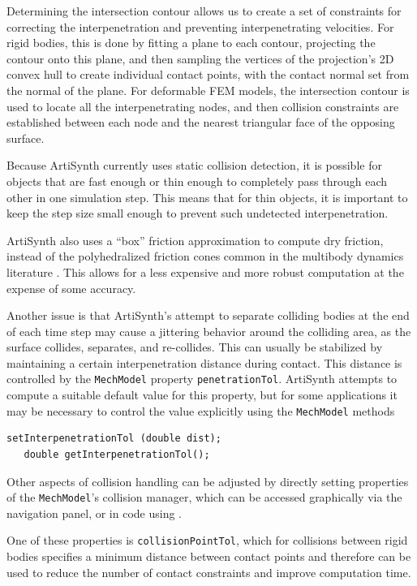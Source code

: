 Determining the intersection contour allows us to create a set of
constraints for correcting the interpenetration and preventing
interpenetrating velocities.  For rigid bodies, this is done by
fitting a plane to each contour, projecting the contour onto this
plane, and then sampling the vertices of the projection's 2D convex
hull to create individual contact points, with the contact normal set
from the normal of the plane. For deformable FEM models, the
intersection contour is used to locate all the interpenetrating nodes,
and then collision constraints are established between each node and
the nearest triangular face of the opposing surface.

Because ArtiSynth currently uses static collision detection, it is
possible for objects that are fast enough or thin enough to completely
pass through each other in one simulation step. This means that for
thin objects, it is important to keep the step size small enough to
prevent such undetected interpenetration.

ArtiSynth also uses a ``box'' friction approximation
\cite{Lacoursiere07} to compute dry friction, instead of the
polyhedralized friction cones common in the multibody dynamics
literature \cite{AnitescuPotra2002,PotraEtAlTrapezoidal2006}.  This
allows for a less expensive and more robust computation at the expense
of some accuracy.

Another issue is that ArtiSynth's attempt to separate colliding bodies
at the end of each time step may cause a jittering behavior around the
colliding area, as the surface collides, separates, and re-collides.
This can usually be stabilized by maintaining a certain
interpenetration distance during contact. This distance is controlled
by the {\tt MechModel} property {\tt penetrationTol}.  ArtiSynth
attempts to compute a suitable default value for this property, but
for some applications it may be necessary to control the value
explicitly using the {\tt MechModel} methods
%
\begin{lstlisting}[]
   setInterpenetrationTol (double dist);
   double getInterpenetrationTol();
\end{lstlisting}
%

Other aspects of collision handling can be adjusted by directly
setting properties of the {\tt MechModel}'s collision manager, which
can be accessed graphically via the navigation panel, or in code using
.

One of these properties is {\tt collisionPointTol}, which for
collisions between rigid bodies specifies a minimum distance between
contact points and therefore can be used to reduce the number of
contact constraints and improve computation time.

